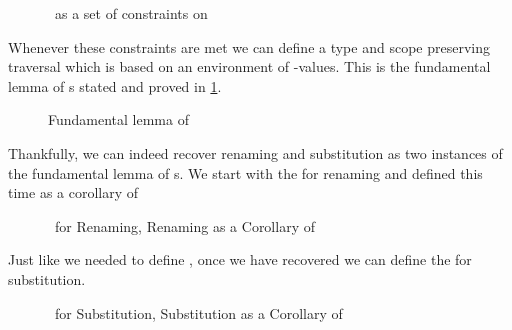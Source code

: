 \begin{figure}[h]
\caption{~as a set of constraints on }
\end{figure}

Whenever these constraints are met we can define a type and scope
preserving traversal which is based on an environment of -values.
This is the fundamental lemma of s stated and proved in \cref{fig:kitlemma}.

\begin{figure}[h]
\caption{Fundamental lemma of \label{fig:kitlemma}}
\end{figure}

Thankfully, we can indeed recover renaming and substitution as two instances of
the fundamental lemma of s. We start with the  for renaming
and  defined this time as a corollary of 

\begin{figure}[h]
\begin{minipage}[t]{0.4\textwidth}
\end{minipage}
\begin{minipage}[t]{0.6\textwidth}
\end{minipage}
\caption{~for Renaming, Renaming as a Corollary of \label{fig:renkit}}
\end{figure}

Just like we needed  to define , once we have recovered 
we can define the  for substitution.

\begin{figure}[h]
\begin{minipage}[t]{0.4\textwidth}
\end{minipage}
\begin{minipage}[t]{0.6\textwidth}
\end{minipage}
\caption{~for Substitution, Substitution as a Corollary of \label{fig:subkit}}
\end{figure}

